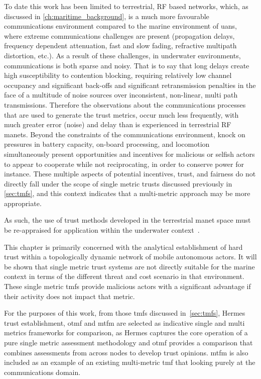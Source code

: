 To date this work has been limited to terrestrial, RF based networks, which, as discussed in \autoref{ch:maritime_background}, is a much more favourable communications environment compared to the marine environment of \glspl{uan}, where extreme communications challenges are present (propagation delays, frequency dependent attenuation, fast and slow fading, refractive multipath distortion, etc.).
As a result of these challenges, in underwater environments, communications is both sparse and noisy.
That is to say that long delays create high susceptibility to contention blocking, requiring relatively low channel occupancy and significant back-offs and significant retransmission penalties in the face of a multitude of noise sources over inconsistent, non-linear, multi path transmissions.
Therefore the observations about the communications processes that are used to generate the trust metrics, occur much less frequently, with much greater error (noise) and delay than is experienced in terrestrial RF \glspl{manet}.
Beyond the constraints of the communications environment, knock on pressures in battery capacity, on-board processing, and locomotion simultaneously present opportunities and incentives for malicious or selfish actors to appear to cooperate while not reciprocating, in order to conserve power for instance.
These multiple aspects of potential incentives, trust, and fairness do not directly fall under the scope of single metric trusts discussed previously in \autoref{sec:tmfs}, and this context indicates that a multi-metric approach may be more appropriate.

As such, the use of trust methods developed in the terrestrial \gls{manet} space must be re-appraised for application within the underwater context~\cite{Pavan2015}.

This chapter is primarily concerned with the analytical establishment of hard trust within a topologically dynamic network of mobile autonomous actors.
It will be shown that single metric trust systems are not directly suitable for the marine context in terms of the different threat and cost scenario in that environment.
These single metric \glspl{tmf} provide malicious actors with a significant advantage if their activity does not impact that metric.

For the purposes of this work, from those \glspl{tmf} discussed in~\autoref{sec:tmfs}, Hermes trust establishment, \gls{otmf} and \gls{mtfm} are selected as indicative single and multi metrics frameworks for comparison, as Hermes captures the core operation of a pure single metric assessment methodology and \gls{otmf} provides a comparison that combines assessments from across nodes to develop trust opinions.
\gls{mtfm} is also included as an example of an existing multi-metric \gls{tmf} that looking purely at the communications domain.


